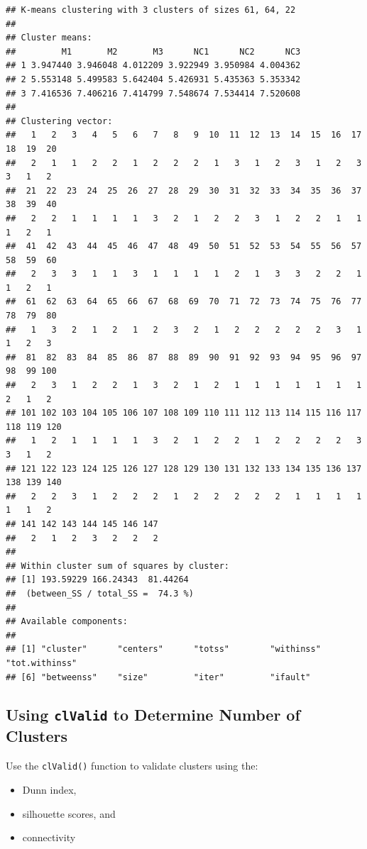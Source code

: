 \documentclass[
]{book}
\providecommand{\tightlist}{%
  \setlength{\itemsep}{0pt}\setlength{\parskip}{0pt}}
\begin{document}
\begin{verbatim}
## K-means clustering with 3 clusters of sizes 61, 64, 22
## 
## Cluster means:
##         M1       M2       M3      NC1      NC2      NC3
## 1 3.947440 3.946048 4.012209 3.922949 3.950984 4.004362
## 2 5.553148 5.499583 5.642404 5.426931 5.435363 5.353342
## 3 7.416536 7.406216 7.414799 7.548674 7.534414 7.520608
## 
## Clustering vector:
##   1   2   3   4   5   6   7   8   9  10  11  12  13  14  15  16  17  18  19  20 
##   2   1   1   2   2   1   2   2   2   1   3   1   2   3   1   2   3   3   1   2 
##  21  22  23  24  25  26  27  28  29  30  31  32  33  34  35  36  37  38  39  40 
##   2   2   1   1   1   1   3   2   1   2   2   3   1   2   2   1   1   1   2   1 
##  41  42  43  44  45  46  47  48  49  50  51  52  53  54  55  56  57  58  59  60 
##   2   3   3   1   1   3   1   1   1   1   2   1   3   3   2   2   1   1   2   1 
##  61  62  63  64  65  66  67  68  69  70  71  72  73  74  75  76  77  78  79  80 
##   1   3   2   1   2   1   2   3   2   1   2   2   2   2   2   3   1   1   2   3 
##  81  82  83  84  85  86  87  88  89  90  91  92  93  94  95  96  97  98  99 100 
##   2   3   1   2   2   1   3   2   1   2   1   1   1   1   1   1   1   2   1   2 
## 101 102 103 104 105 106 107 108 109 110 111 112 113 114 115 116 117 118 119 120 
##   1   2   1   1   1   1   3   2   1   2   2   1   2   2   2   2   3   3   1   2 
## 121 122 123 124 125 126 127 128 129 130 131 132 133 134 135 136 137 138 139 140 
##   2   2   3   1   2   2   2   1   2   2   2   2   2   1   1   1   1   1   1   2 
## 141 142 143 144 145 146 147 
##   2   1   2   3   2   2   2 
## 
## Within cluster sum of squares by cluster:
## [1] 193.59229 166.24343  81.44264
##  (between_SS / total_SS =  74.3 %)
## 
## Available components:
## 
## [1] "cluster"      "centers"      "totss"        "withinss"     "tot.withinss"
## [6] "betweenss"    "size"         "iter"         "ifault"
\end{verbatim}

\subsection{\texorpdfstring{Using \texttt{clValid} to Determine Number of Clusters}{Using clValid to Determine Number of Clusters}}\label{using-clvalid-to-determine-number-of-clusters}

Use the \texttt{clValid()} function to validate clusters using the:

\begin{itemize}
\tightlist
\item
  Dunn index,
\item
  silhouette scores, and
\item
  connectivity
\end{itemize}
\end{document}
